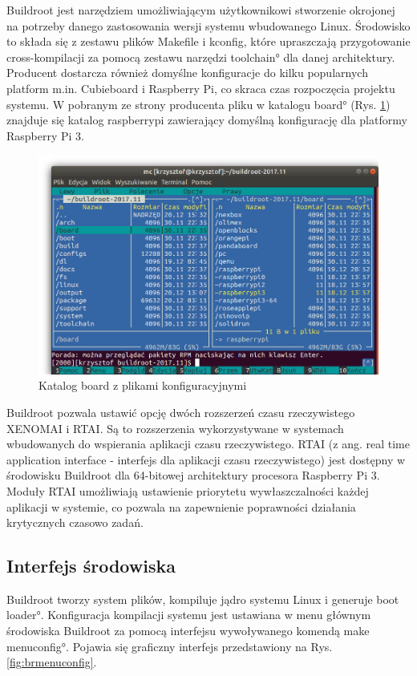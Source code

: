 Buildroot jest narzędziem umożliwiającym użytkownikowi stworzenie okrojonej na potrzeby danego zastosowania wersji systemu wbudowanego Linux. Środowisko to składa się z zestawu plików Makefile i kconfig, które upraszczają przygotowanie cross-kompilacji za pomocą zestawu narzędzi \ang{toolchain} dla danej architektury. Producent dostarcza również domyślne konfiguracje do kilku popularnych platform m.in. Cubieboard i Raspberry Pi, co skraca czas rozpoczęcia projektu systemu. W pobranym ze strony producenta pliku w katalogu \ang{board} (Rys. \ref{fig:brakat}) znajduje się katalog raspberrypi zawierający domyślną konfigurację dla platformy Raspberry Pi 3.
\begin{figure}[h]
	\centering
		\includegraphics[width=13cm]{buildroot_katalogi}
	\caption{Katalog board z plikami konfiguracyjnymi} 
	\label{fig:brakat}
\end{figure}

Buildroot pozwala ustawić opcję dwóch rozszerzeń czasu rzeczywistego XENOMAI i RTAI. Są to rozszerzenia wykorzystywane w systemach wbudowanych do wspierania aplikacji czasu rzeczywistego.
RTAI (z ang. real time application interface - interfejs dla aplikacji czasu rzeczywistego) jest dostępny w środowisku Buildroot dla 64-bitowej architektury procesora Raspberry Pi 3. Moduły RTAI umożliwiają ustawienie priorytetu wywłaszczalności każdej aplikacji w systemie, co pozwala na zapewnienie poprawności działania krytycznych czasowo zadań.


\subsection{Interfejs środowiska}
Buildroot tworzy system plików, kompiluje jądro systemu Linux i generuje \ang{boot loader}. Konfiguracja kompilacji systemu jest ustawiana w menu głównym środowiska Buildroot za pomocą interfejsu wywoływanego komendą \ang{make menuconfig}. Pojawia się graficzny interfejs przedstawiony na Rys. \ref{fig:brmenuconfig}. 

